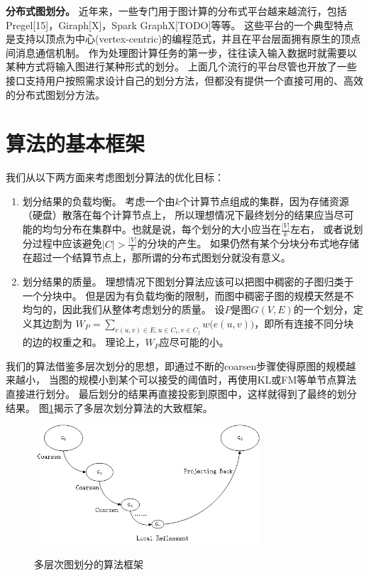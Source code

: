 \documentclass[master]{njuthesis}
\begin{document}
\textbf{分布式图划分。 } 近年来，一些专门用于图计算的分布式平台越来越流行，包括Pregel[15]，Giraph[X]，Spark GraphX[TODO]等等。
这些平台的一个典型特点是支持以顶点为中心(vertex-centric)的编程范式，并且在平台层面拥有原生的顶点间消息通信机制。
作为处理图计算任务的第一步，往往读入输入数据时就需要以某种方式将输入图进行某种形式的划分。
上面几个流行的平台尽管也开放了一些接口支持用户按照需求设计自己的划分方法，但都没有提供一个直接可用的、高效的分布式图划分方法。

\section{算法的基本框架}
我们从以下两方面来考虑图划分算法的优化目标：
\begin{enumerate}
 \item 划分结果的负载均衡。 考虑一个由$k$个计算节点组成的集群，因为存储资源（硬盘）散落在每个计算节点上，
 所以理想情况下最终划分的结果应当尽可能的均匀分布在集群中。也就是说，每个划分的大小应当在$\frac{|V|}{k}$左右，
 或者说划分过程中应该避免$|C| > \frac{|V|}{k}$的分块的产生。
 如果仍然有某个分块分布式地存储在超过一个结算节点上，那所谓的分布式图划分就没有意义。
 \item 划分结果的质量。 理想情况下图划分算法应该可以把图中稠密的子图归类于一个分块中。
 但是因为有负载均衡的限制，而图中稠密子图的规模天然是不均匀的，因此我们从整体考虑划分的质量。
 设$P$是图$G(V,E)$的一个划分，定义其边割为
 $W_{P}=\sum\nolimits_{e(u,v) \in E, u \in C_i, v \in C_j} w\big(e(u,v)\big)$，即所有连接不同分块的边的权重之和。
 理论上，$W_P$应尽可能的小。
\end{enumerate}

我们的算法借鉴多层次划分的思想，即通过不断的coarsen步骤使得原图的规模越来越小，
当图的规模小到某个可以接受的阈值时，再使用KL或FM等单节点算法直接进行划分。
最后划分的结果再直接投影到原图中，这样就得到了最终的划分结果。
图\ref{fig:mlp_framework}揭示了多层次划分算法的大致框架。
\begin{figure}[htbp]
  \centering
  \includegraphics[width= 0.75\textwidth]{figure/coarsen.jpg}\\
  \caption{多层次图划分的算法框架}
   \label{fig:mlp_framework}
\end{figure}
\end{document}
